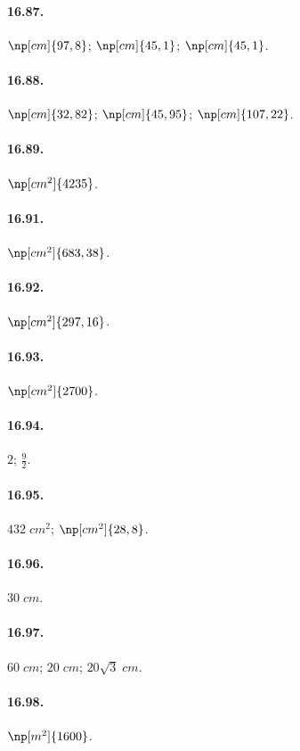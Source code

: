 \begin{multicols}{2}
\paragraph{16.87.}
$\np[cm]{97,8}$; $\np[cm]{45,1}$; $\np[cm]{45,1}$.

\paragraph{16.88.}
$\np[cm]{32,82}$; $\np[cm]{45,95}$; $\np[cm]{107,22}$.

\paragraph{16.89.}
$\np[cm^2]{4235}$.

\paragraph{16.91.}
$\np[cm^2]{683,38}$.

\paragraph{16.92.}
$\np[cm^2]{297,16}$.

\paragraph{16.93.}
$\np[cm^2]{2700}$.

\paragraph{16.94.}
$2$; $\frac{9}{2}$.

\paragraph{16.95.}
$432\;\unit{cm^2}$; $\np[cm^2]{28,8}$.

\paragraph{16.96.}
$30\;\unit{cm}$.

\paragraph{16.97.}
$60\;\unit{cm}$; $20\;\unit{cm}$; $20\sqrt{3}\;\unit{cm}$.

\paragraph{16.98.}
$\np[m^2]{1600}$.


\end{multicols}
